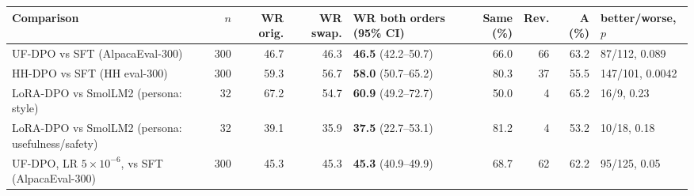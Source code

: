 \begin{tabular}{lrrrlrrrl}
\toprule
Comparison & $n$ & WR orig. & WR swap. & WR both orders (95\% CI) & Same (\%) & Rev. & A (\%) & better/worse, $p$ \\
\midrule
UF-DPO vs SFT (AlpacaEval-300) & 300 & 46.7 & 46.3 & \textbf{46.5} (42.2--50.7) & 66.0 & 66 & 63.2 & 87/112, 0.089 \\
HH-DPO vs SFT (HH eval-300) & 300 & 59.3 & 56.7 & \textbf{58.0} (50.7--65.2) & 80.3 & 37 & 55.5 & 147/101, 0.0042 \\
LoRA-DPO vs SmolLM2 (persona: style) & 32 & 67.2 & 54.7 & \textbf{60.9} (49.2--72.7) & 50.0 & 4 & 65.2 & 16/9, 0.23 \\
LoRA-DPO vs SmolLM2 (persona: usefulness/safety) & 32 & 39.1 & 35.9 & \textbf{37.5} (22.7--53.1) & 81.2 & 4 & 53.2 & 10/18, 0.18 \\
UF-DPO, LR $5{\times}10^{-6}$, vs SFT (AlpacaEval-300) & 300 & 45.3 & 45.3 & \textbf{45.3} (40.9--49.9) & 68.7 & 62 & 62.2 & 95/125, 0.05 \\
\bottomrule
\end{tabular}
